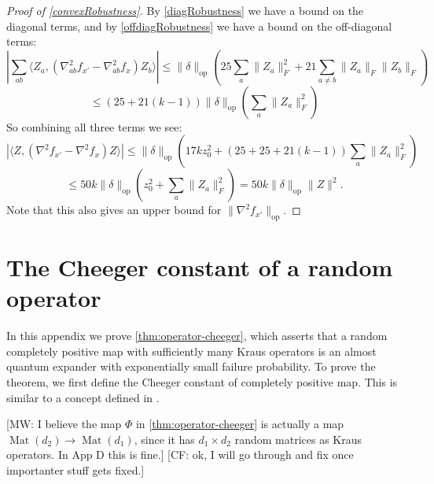 \documentclass[aos]{imsart}
\theoremstyle{definition}
\numberwithin{equation}{section}
\DeclareMathOperator{\op}{op}
\DeclareMathOperator{\Mat}{Mat}
\newcommand{\samp}{x}
\newcommand{\CF}[1]{{\color{purple}[CF: #1]}}
\newcommand{\AR}[1]{{\color{orange}[AR: #1]}}
\newcommand{\MW}[1]{{\color{red}[MW: #1]}}
\newcommand{\CF}[1]{{}}
\newcommand{\AR}[1]{{}}
\newcommand{\MW}[1]{{}}
\begin{document}
\begin{appendix}
\begin{proof} [Proof of \cref{convexRobustness}]
By \cref{diagRobustness} we have a bound on the diagonal terms, and by \cref{offdiagRobustness} we have a bound on the off-diagonal terms:
\[ |\sum_{ab} \langle Z_{a}, (\nabla^{2}_{ab} f_{\samp'} - \nabla^{2}_{ab} f_{\samp} ) Z_{b} \rangle | \leq \|\delta\|_{\op} \left( 25 \sum_{a} \|Z_{a}\|_{F}^{2} + 21 \sum_{a \neq b} \|Z_{a}\|_{F} \|Z_{b}\|_{F} \right)   \]
\[ \leq (25 + 21(k-1)) \|\delta\|_{\op} \left( \sum_{a} \|Z_{a}\|_{F}^{2} \right)   \]
So combining all three terms we see:
\[ |\langle Z, (\nabla^{2} f_{\samp'} - \nabla^{2} f_{\samp} ) Z \rangle | \leq \|\delta\|_{\op} \left( 17 k z_{0}^{2} + (25 + 25 + 21 (k-1)) \sum_{a} \|Z_{a}\|_{F}^{2} \right)    \]
\[ \leq 50 k \|\delta\|_{\op} \left( z_{0}^{2} + \sum_{a} \|Z_{a}\|_{F}^{2} \right)  = 50 k \|\delta\|_{\op} \|Z\|^2.  \]
Note that this also gives an upper bound for $\|\nabla^{2} f_{\samp'}\|_{\op}$.
\end{proof}

\section{The Cheeger constant of a random operator}\label{app:cheeky}
In this appendix we prove \cref{thm:operator-cheeger}, which asserts that a random completely positive map with sufficiently many Kraus operators is an almost quantum expander with exponentially small failure probability.
To prove the theorem, we first define the Cheeger constant of completely positive map.
This is similar to a concept defined in \cite{H07}.

\MW{I believe the map $\Phi$ in \cref{thm:operator-cheeger} is actually a map $\Mat(d_2) \to \Mat(d_1)$, since it has $d_1 \times d_2$ random matrices as Kraus operators. In App D this is fine.} \CF{ok, I will go through and fix once importanter stuff gets fixed.}


\end{appendix}
\end{document}

